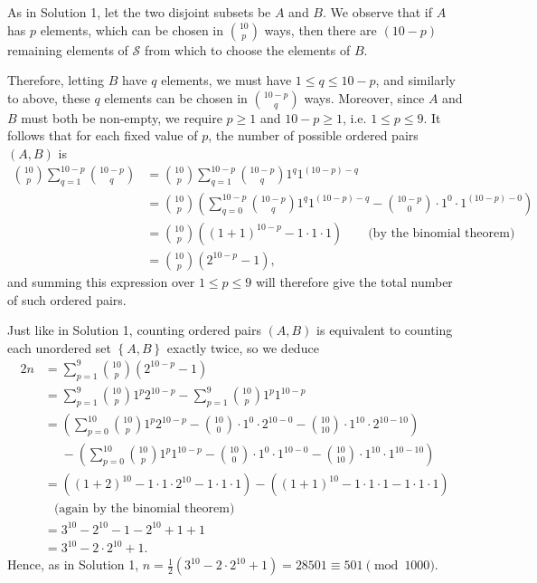 \begin{enumerate}
As in Solution 1, let the two disjoint subsets be $A$ and $B$. We observe that if $A$ has $p$ elements, which can be chosen in $\binom{10}{p}$ ways, then there are $(10-p)$ remaining elements of $\mathcal{S}$ from which to choose the elements of $B$.

 Therefore, letting $B$ have $q$ elements, we must have $1 \leq q \leq 10-p$, and similarly to above, these $q$ elements can be chosen in $\binom{10-p}{q}$ ways. Moreover, since $A$ and $B$ must both be non-empty, we require $p \geq 1$ and $10-p \geq 1$, i.e. $1 \leq p \leq 9$. It follows that for each fixed value of $p$, the number of possible ordered pairs $(A,B)$ is 
 \begin{align*}\binom{10}{p}\sum_{q=1}^{10-p}\binom{10-p}{q} &= \binom{10}{p}\sum_{q=1}^{10-p}\binom{10-p}{q}1^q 1^{(10-p)-q} \\ &= \binom{10}{p}\left(\sum_{q=0}^{10-p}\binom{10-p}{q}1^q 1^{(10-p)-q} - \binom{10-p}{0}\cdot 1^0 \cdot 1^{(10-p)-0}\right) \\ &= \binom{10}{p}\left(\left(1+1\right)^{10-p} - 1 \cdot 1 \cdot 1\right) \qquad \text{(by the binomial theorem)} \\ &= \binom{10}{p}\left(2^{10-p}-1\right),\end{align*}
 and summing this expression over $1 \leq p \leq 9$ will therefore give the total number of such ordered pairs.

 Just like in Solution 1, counting ordered pairs $(A,B)$ is equivalent to counting each unordered set $\left\{A,B\right\}$ exactly twice, so we deduce 
 \begin{align*}2n &= \sum_{p=1}^{9}\binom{10}{p}\left(2^{10-p}-1\right) \\ &= \sum_{p=1}^{9}\binom{10}{p}1^p 2^{10-p} - \sum_{p=1}^{9}\binom{10}{p}1^p 1^{10-p} \\ &= \left(\sum_{p=0}^{10}\binom{10}{p}1^p 2^{10-p} - \binom{10}{0} \cdot 1^0 \cdot 2^{10-0} - \binom{10}{10} \cdot 1^{10} \cdot 2^{10-10}\right) \\ &\phantom{=} -\left(\sum_{p=0}^{10}\binom{10}{p}1^p 1^{10-p} - \binom{10}{0} \cdot 1^0 \cdot 1^{10-0} - \binom{10}{10} \cdot 1^{10} \cdot 1^{10-10}\right) \\ &= \left(\left(1+2\right)^{10} - 1 \cdot 1 \cdot 2^{10} - 1 \cdot 1 \cdot 1\right) - \left(\left(1+1\right)^{10} - 1 \cdot 1 \cdot 1 - 1 \cdot 1 \cdot 1\right) \\ &\phantom{=} \text{(again by the binomial theorem)} \\ &= 3^{10}-2^{10}-1-2^{10}+1+1 \\ &= 3^{10} - 2 \cdot 2^{10} + 1.\end{align*}
 Hence, as in Solution 1, $n = \frac{1}{2}\left(3^{10}-2\cdot2^{10}+1\right) = 28501 \equiv \boxed{501} \pmod{1000}$.


\end{enumerate}

